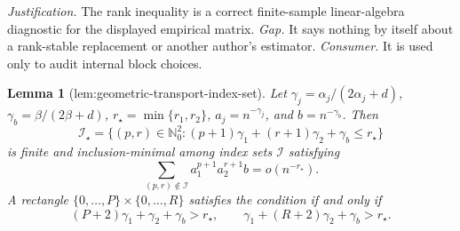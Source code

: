 \documentclass{article}
\newtheorem{lemma}{Lemma}
\begin{document}
\par\smallskip\noindent \textit{Justification.} The rank inequality is a correct finite-sample linear-algebra diagnostic for the displayed empirical matrix. \textit{Gap.} It says nothing by itself about a rank-stable replacement or another author's estimator. \textit{Consumer.} It is used only to audit internal block choices.

\begin{lemma}[lem:geometric-transport-index-set]\label{lem:geometric-transport-index-set}
Let \(\gamma_j=\alpha_j/(2\alpha_j+d)\), \(\gamma_b=\beta/(2\beta+d)\), \(r_\star=\min\{r_1,r_2\}\), \(a_j=n^{-\gamma_j}\), and \(b=n^{-\gamma_b}\). Then
\[
\mathcal I_\star=\{(p,r)\in\mathbb N_0^2:(p+1)\gamma_1+(r+1)\gamma_2+\gamma_b\le r_\star\}
\]
is finite and inclusion-minimal among index sets \(\mathcal I\) satisfying
\[
\sum_{(p,r)\notin\mathcal I}a_1^{p+1}a_2^{r+1}b=o(n^{-r_\star}).
\]
A rectangle \(\{0,\ldots,P\}\times\{0,\ldots,R\}\) satisfies the condition if and only if
\[
(P+2)\gamma_1+\gamma_2+\gamma_b>r_\star,\qquad \gamma_1+(R+2)\gamma_2+\gamma_b>r_\star.
\]
\end{lemma}
\end{document}
